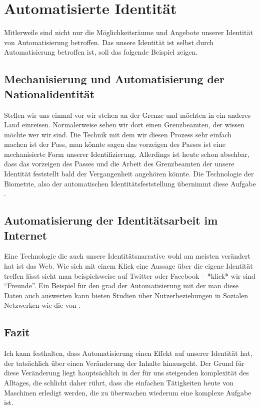 \section {Automatisierte Identität}

Mitlerweile sind nicht nur die Möglichkeitsräume und Angebote unserer Identität von Automatisierung betroffen.
Das unsere Identität ist selbst durch Automatisierung betroffen ist, soll das folgende Beispiel zeigen.

\subsection {Mechanisierung und Automatisierung der Nationalidentität}

Stellen wir uns einmal vor wir stehen an der Grenze und möchten in ein anderes Land einreisen.
Normalerweise sehen wir dort einen Grenzbeamten, der wissen möchte wer wir sind.
Die Technik mit dem wir diesen Prozess sehr einfach machen ist der Pass, man könnte sagen das vorzeigen des Passes ist eine mechanisierte Form unserer Identifizierung.
Allerdings ist heute schon absehbar, dass das vorzeigen des Passes und die Arbeit des Grenzbeamten der unsere Identität feststellt bald der Vergangenheit angehören könnte.
Die Technologie der Biometrie, also der automatischen Identitätsfeststellung übernimmt diese Aufgabe \parencite{knaut}.

\subsection {Automatisierung der Identitätsarbeit im Internet}

Eine Technologie die auch unsere Identitätsnarrative wohl am meisten verändert hat ist das Web.
Wie sich mit einem Klick eine Aussage über die eigene Identität treffen lässt sieht man beispielsweise auf Twitter oder Facebook – *klick* wir sind \enquote{Freunde}.
Ein Beispiel für den grad der Automatisierung mit der man diese Daten auch auswerten kann bieten Studien über Nutzerbeziehungen in Sozialen Netzwerken wie die von \cite{maireder}.

\subsection {Fazit}

Ich kann festhalten, dass Automatisierung einen Effekt auf unserer Identität hat, der tatsächlich über einen Veränderung der Inhalte hinausgeht.
Der Grund für diese Veränderung liegt hauptsächlich in der für uns steigenden komplexität des Alltages, die schlicht daher rührt, dass die einfachen Tätigkeiten heute von Maschinen erledigt werden, die zu überwachen wiederum eine komplexe Aufgabe ist.
